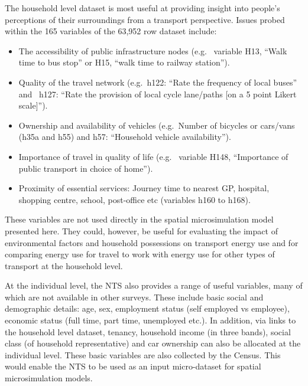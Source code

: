 The household level dataset is most useful at providing insight into people's
perceptions of their surroundings from a transport perspective. Issues probed
within the 165 variables of the 63,952 row dataset include:
\begin{itemize}
 \item The accessibility of public infrastructure nodes (e.g.~ variable H13,
``Walk time to bus stop'' or H15, ``walk time to railway station'').
\item Quality of the travel network (e.g.~h122: ``Rate the frequency of local
buses'' and  ~h127: ``Rate the provision of local cycle lane/paths [on a 5 point
Likert scale]'').
\item Ownership and availability of vehicles (e.g.~Number of bicycles or
cars/vans (h35a and h55) and h57: ``Household vehicle availability'').
\item Importance of travel in quality of life (e.g.~ variable H148, ``Importance
of public transport in choice of home'').
\item Proximity of essential services:
Journey time to nearest GP, hospital, shopping centre, school, post-office
etc (variables h160 to h168).
\end{itemize}
These variables are not used directly in the spatial microsimulation model
presented here. They could, however, be useful for evaluating the
impact of
environmental factors and household possessions on transport energy use and for
comparing energy use for travel to work with energy use for other types of
transport at the household level. 

At the individual level, the NTS also provides a range of useful
variables, many of which are not available in other surveys. These include basic
social and demographic
details: age, sex, employment status (self employed vs employee), economic
status (full time, part time, unemployed etc.). In addition, via links to the
household level dataset, tenancy, household income (in three bands), social
class (of household representative) and car ownership can also be allocated at
the individual level.
These basic variables are also collected by the Census. This would enable
the NTS to be used as an input micro-dataset for spatial microsimulation models.

